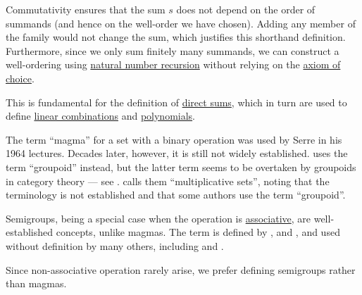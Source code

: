 \begin{remark}
\begin{thmenum}
\begin{thmenum}
      Commutativity ensures that the sum \( s \) does not depend on the order of summands (and hence on the well-order we have chosen). Adding any member of the family would not change the sum, which justifies this shorthand definition. Furthermore, since we only sum finitely many summands, we can construct a well-ordering using \hyperref[rem:natural_number_recursion]{natural number recursion} without relying on the \hyperref[def:zfc/choice]{axiom of choice}.

      This is fundamental for the definition of \hyperref[def:first_order_direct_product]{direct sums}, which in turn are used to define \hyperref[rem:linear_combinations]{linear combinations} and \hyperref[def:polynomial_algebra]{polynomials}.
    \end{thmenum}
  \end{thmenum}
\end{remark}

\begin{remark}\label{rem:magma_terminology}
  The term \enquote{magma} for a set with a binary operation was used by Serre in his 1964 lectures. Decades later, however, it is still not widely established.  uses the term \enquote{groupoid} instead, but the latter term seems to be overtaken by groupoids in category theory --- see .  calls them \enquote{multiplicative sets}, noting that the terminology is not established and that some authors use the term \enquote{groupoid}.

  Semigroups, being a special case when the operation is \hyperref[def:binary_operation/associative]{associative}, are well-established concepts, unlike magmas. The term is defined by ,  and , and used without definition by many others, including  and .

  Since non-associative operation rarely arise, we prefer defining semigroups rather than magmas.
\end{remark}

